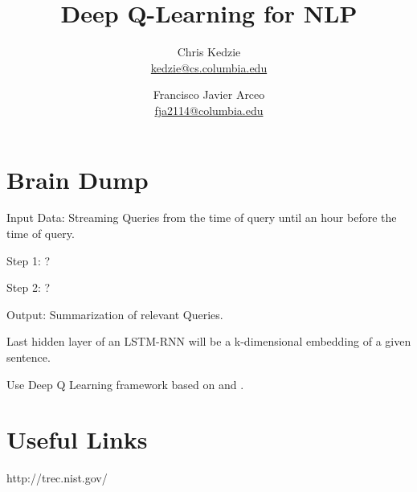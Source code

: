 \documentclass[12pt]{article}
\title{Deep Q-Learning for NLP}
\author{
	Chris Kedzie \\ \href{mailto: kedzie@cs.columbia.edu}{\small kedzie@cs.columbia.edu} 
		\and  
	Francisco Javier Arceo \\ \href{mailto: fja2114@columbia.edu}{\small fja2114@columbia.edu} 
	}
\begin{document}
\maketitle




\section{Brain Dump}

Input Data: Streaming Queries from the time of query until an hour before the time of query. 

Step 1:  ?

Step 2:  ?

Output: Summarization of relevant Queries.

Last hidden layer of an LSTM-RNN will be a k-dimensional embedding of a given sentence. 

Use Deep Q Learning framework based on \cite{MnihKSGAWR13} and \cite{DBLP:journals/corr/MnihBMGLHSK16}.

\section{Useful Links}

http://trec.nist.gov/



\end{document}
